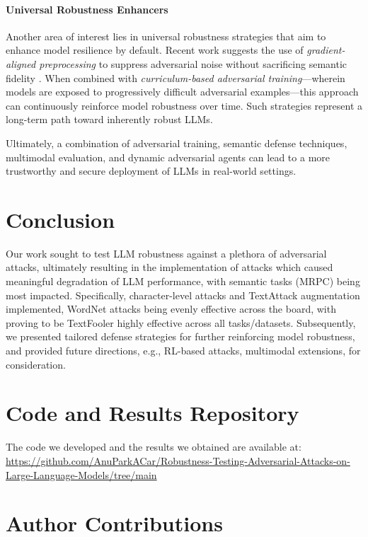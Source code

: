 \documentclass[conference]{IEEEtran}
\begin{document}
\paragraph{Universal Robustness Enhancers}
Another area of interest lies in universal robustness strategies that aim to enhance model resilience by default. Recent work suggests the use of \textit{gradient-aligned preprocessing} to suppress adversarial noise without sacrificing semantic fidelity \cite{omar2022robust}. When combined with \textit{curriculum-based adversarial training}—wherein models are exposed to progressively difficult adversarial examples—this approach can continuously reinforce model robustness over time. Such strategies represent a long-term path toward inherently robust LLMs.

\bigskip
Ultimately, a combination of adversarial training, semantic defense techniques, multimodal evaluation, and dynamic adversarial agents can lead to a more trustworthy and secure deployment of LLMs in real-world settings.

\section{Conclusion}

Our work sought to test LLM robustness against a plethora of adversarial attacks, ultimately resulting in the implementation of attacks which caused meaningful degradation of LLM performance, with semantic tasks (MRPC) being most impacted. Specifically, character-level attacks and TextAttack augmentation implemented, WordNet attacks being evenly effective across the board, with proving to be TextFooler highly effective across all tasks/datasets. Subsequently, we presented tailored defense strategies for further reinforcing model robustness, and provided future directions, e.g., RL-based attacks, multimodal extensions, for consideration.

\section*{Code and Results Repository}

The code we developed and the results we obtained are available at: \url{https://github.com/AnuParkACar/Robustness-Testing-Adversarial-Attacks-on-Large-Language-Models/tree/main}

\section*{Author Contributions}
\end{document}

